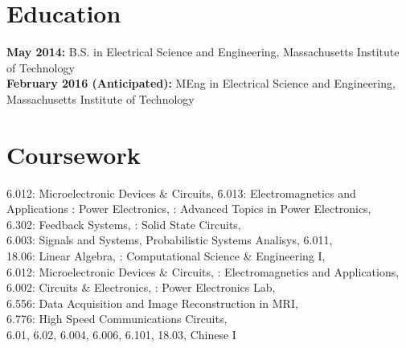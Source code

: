 \documentclass{res}
\begin{document}
 


\address{mspatz@mit.edu\\mark.h.spatz@gmail.com  }
\address{(816)-679-1502}

\begin{resume}
        
\section{Education}
\vspace{0.05in} 

{\bf May 2014:} B.S. in Electrical Science and Engineering, Massachusetts Institute of Technology\\
{\bf February 2016 (Anticipated):} MEng in Electrical Science and Engineering, Massachusetts Institute of Technology
\section{Coursework}
	\vspace{-0.05in}
	\begin{tabbing}
	6.012: Microelectronic Devices \& Circuits, \=6.013: Electromagnetics and Applications : Power Electronics, : Advanced Topics in Power Electronics,\\
	6.302: Feedback Systems,  : Solid State Circuits,\\
	6.003: Signals and Systems,  Probabilistic Systems Analisys, 6.011,\\
	18.06: Linear Algebra, : Computational Science \& Engineering I,\\
	6.012: Microelectronic Devices \& Circuits, : Electromagnetics and Applications,\\
	6.002: Circuits \& Electronics, : Power Electronics Lab,\\
	6.556: Data Acquisition and Image Reconstruction in MRI,\\
	6.776: High Speed Communications Circuits,\\
	6.01, 6.02, 6.004, 6.006, 6.101, 18.03, Chinese I
	\end{tabbing}


\end{resume}
\end{document}

